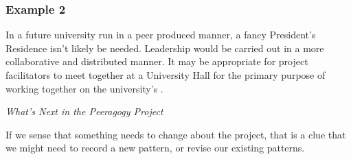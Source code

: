 \subsubsection*{Example 2}
In a future university run in a peer produced manner, a fancy
President's Residence isn't likely be needed.  Leadership would be
carried out in a more collaborative and distributed manner.  It may be
appropriate for project facilitators to meet together at a University
Hall for the primary purpose of working together on the university's
.


\smallskip
\bigskip

\begin{framed}
\noindent
\emph{What's Next in the Peeragogy Project}
\begin{collectinmacro}{\RoadmapWN}{}{}
If we sense that something needs to change about the project, that is a clue that we might need to record a new pattern, or revise our existing patterns.
\end{collectinmacro}
\RoadmapWN
\end{framed}

\newpage
